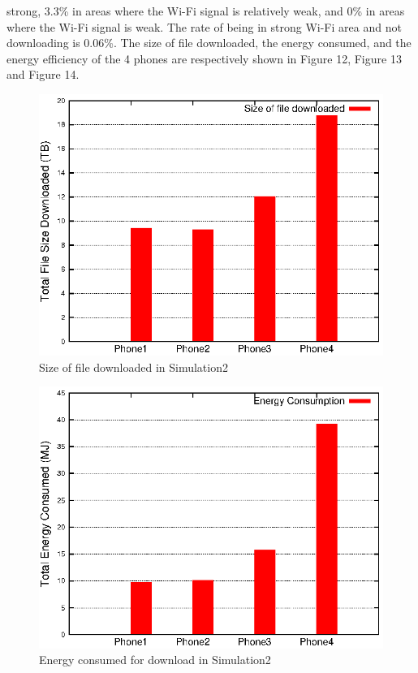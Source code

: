 \documentclass[journal]{IEEEtran}
\begin{document}
strong, 3.3\% in areas where the Wi-Fi signal is relatively weak, and 0\% in areas where the Wi-Fi signal is weak. The rate of being in 
strong Wi-Fi area and not downloading is 0.06\%. The size of file downloaded, 
the energy consumed, and the energy efficiency of the 4 phones are respectively shown in Figure 12, Figure 13 and Figure 14.
\begin{figure}
\centering
\includegraphics[scale=0.85]{result_markov_downloadsize.eps}
\caption{Size of file downloaded in Simulation2}
\end{figure}
\begin{figure}
\centering
\includegraphics[scale=0.85]{result_markov_energy.eps}
\caption{Energy consumed for download in Simulation2}
\end{figure}
\end{document}
